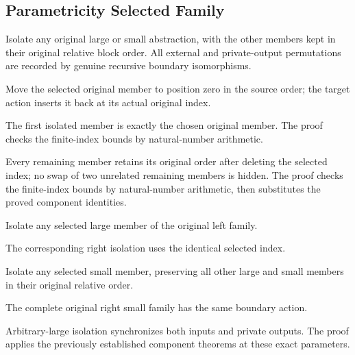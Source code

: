\subsection{Parametricity Selected Family}
Isolate any original large or small abstraction, with the other members
kept in their original relative block order. All external and private-output
permutations are recorded by genuine recursive boundary isomorphisms.

Move the selected original member to position zero in the source order;
the target action inserts it back at its actual original index.
\par{}

The first isolated member is exactly the chosen original member.
The proof checks the finite-index bounds by natural-number arithmetic.
\par{}

Every remaining member retains its original order after deleting the
selected index; no swap of two unrelated remaining members is hidden.
The proof checks the finite-index bounds by natural-number arithmetic, then substitutes the proved component identities.
\par{}

Isolate any selected large member of the original left family.
\par{}

The corresponding right isolation uses the identical selected index.
\par{}

Isolate any selected small member, preserving all other large and small
members in their original relative order.
\par{}

The complete original right small family has the same boundary action.
\par{}

Arbitrary-large isolation synchronizes both inputs and private outputs.
The proof applies the previously established component theorems at these exact parameters.
\par{}

